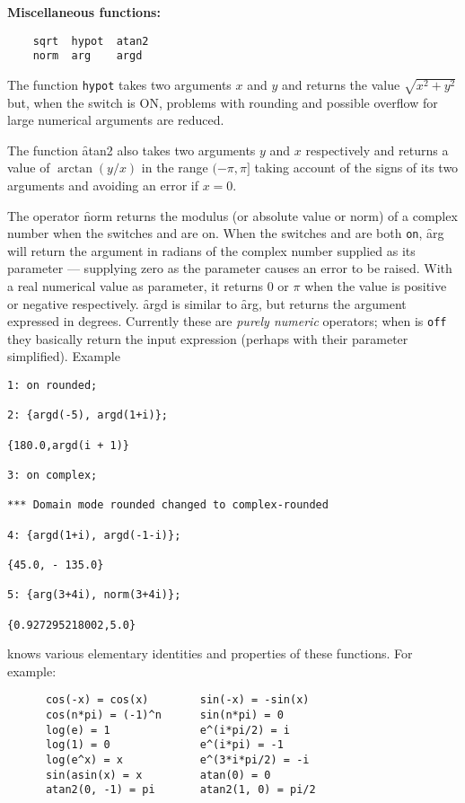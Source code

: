 \textbf{Miscellaneous functions:}
\begin{verbatim}
    sqrt  hypot  atan2
    norm  arg    argd
\end{verbatim}
The function \texttt{hypot} takes two arguments $x$  and $y$ and
returns the value $\sqrt{x^2+y^2}$ but, when the switch  is ON,
problems with rounding and possible overflow for large numerical arguments
are reduced.

The function \f{atan2} also takes two arguments $y$ and $x$
respectively and returns a value of $\arctan(y/x)$ in the range
$(-\pi, \pi]$ taking account of the signs of its two arguments and
avoiding an error if $x=0$.

The operator \f{norm} returns the modulus (or absolute value or norm) of a complex number when the switches  and  are on.
When the switches  and  are both \texttt{on}, \f{arg} will return the argument in radians of the complex number supplied as its parameter  --- supplying zero as the parameter causes an error to be raised.  With a real numerical value as parameter, it returns $0$ or $\pi$ when the value is positive or negative respectively.
\f{argd} is similar to \f{arg}, but returns the argument expressed in  degrees.
Currently these are \emph{purely numeric} operators; when  is \texttt{off} they basically return the input expression (perhaps with their parameter simplified).
Example
\begin{verbatim}
1: on rounded;

2: {argd(-5), argd(1+i)};

{180.0,argd(i + 1)}

3: on complex;

*** Domain mode rounded changed to complex-rounded

4: {argd(1+i), argd(-1-i)};

{45.0, - 135.0}

5: {arg(3+4i), norm(3+4i)};

{0.927295218002,5.0}

\end{verbatim}

{\REDUCE} knows various elementary identities and properties
of these functions. For example:
\begin{verbatim}
      cos(-x) = cos(x)        sin(-x) = -sin(x)
      cos(n*pi) = (-1)^n      sin(n*pi) = 0
      log(e) = 1              e^(i*pi/2) = i
      log(1) = 0              e^(i*pi) = -1
      log(e^x) = x            e^(3*i*pi/2) = -i
      sin(asin(x) = x         atan(0) = 0
      atan2(0, -1) = pi       atan2(1, 0) = pi/2
\end{verbatim}

